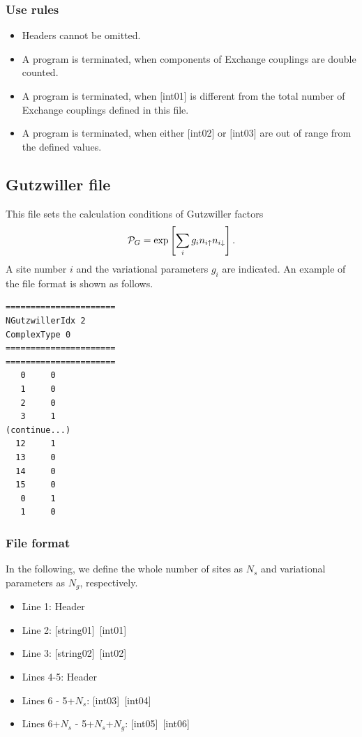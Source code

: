 \subsubsection{Use rules}
\begin{itemize}
\item Headers cannot be omitted. 
\item A program is terminated, when components of Exchange couplings are double counted.
\item A program is terminated, when $[$int01$]$ is different from the total number of Exchange couplings defined in this file.
\item A program is terminated, when either $[$int02$]$ or $[$int03$]$ are out of range from the defined values.
\end{itemize}

\newpage
\subsection{Gutzwiller file}
\label{Subsec:Gutzwiller}
This file sets the calculation conditions of Gutzwiller factors 
\begin{equation}
{\cal P}_G=\exp\left[ \sum_i g_i n_{i\uparrow} n_{i\downarrow} \right].
\end{equation}
A site number $i$ and the variational parameters $g_i$ are indicated.
An example of the file format is shown as follows.

\begin{minipage}{12.5cm}
\begin{screen}
\begin{verbatim}
======================
NGutzwillerIdx 2  
ComplexType 0
====================== 
====================== 
   0     0
   1     0
   2     0
   3     1
(continue...)
  12     1
  13     0
  14     0
  15     0
   0     1
   1     0
\end{verbatim}
\end{screen}
\end{minipage}

\subsubsection{File format}
In the following, we define the whole number of sites as $N_s$ and variational parameters as $N_g$, respectively.  
 \begin{itemize}
   \item  Line 1: Header
   \item  Line 2: [string01]~[int01]
   \item  Line 3: [string02]~[int02]
   \item  Lines 4-5:  Header
   \item  Lines 6 - 5+$N_s$: [int03]~[int04]
   \item  Lines 6+$N_s$ - 5+$N_s$+$N_g$: [int05]~[int06]
  \end{itemize}

